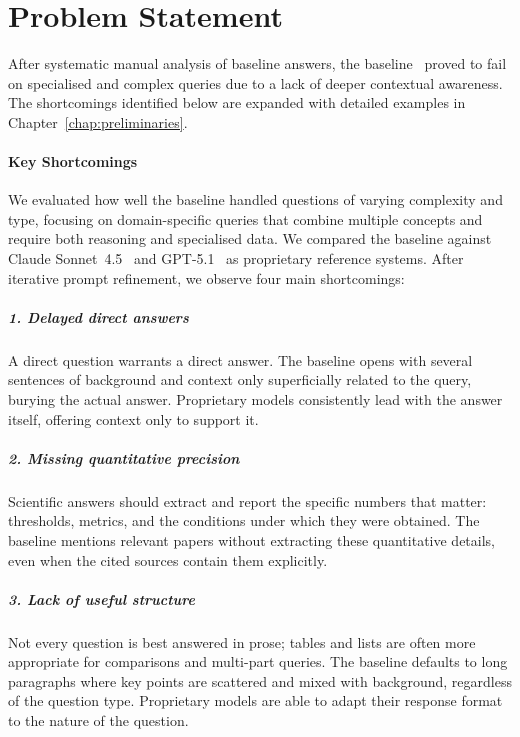 \section{Problem Statement}
\label{sec:problem}

After systematic manual analysis of baseline answers, the baseline~\citep{elbaff2025earthobservationrag} proved to fail on specialised and complex queries due to a lack of deeper contextual awareness. The shortcomings identified below are expanded with detailed examples in Chapter~\ref{chap:preliminaries}.

\paragraph{Key Shortcomings}\label{para:shortcomings}

We evaluated how well the baseline handled questions of varying complexity and type, focusing on domain-specific queries that combine multiple concepts and require both reasoning and specialised data. We compared the baseline against Claude Sonnet~4.5~\citep{anthropic2024claude} and GPT-5.1~\citep{openai2024gpt4} as proprietary reference systems. After iterative prompt refinement, we observe four main shortcomings:

\subparagraph{1. Delayed direct answers}

A direct question warrants a direct answer. The baseline opens with several sentences of background and context only superficially related to the query, burying the actual answer. Proprietary models consistently lead with the answer itself, offering context only to support it.

\subparagraph{2. Missing quantitative precision}

Scientific answers should extract and report the specific numbers that matter: thresholds, metrics, and the conditions under which they were obtained. The baseline mentions relevant papers without extracting these quantitative details, even when the cited sources contain them explicitly.

\subparagraph{3. Lack of useful structure}

Not every question is best answered in prose; tables and lists are often more appropriate for comparisons and multi-part queries. The baseline defaults to long paragraphs where key points are scattered and mixed with background, regardless of the question type. Proprietary models are able to adapt their response format to the nature of the question.

